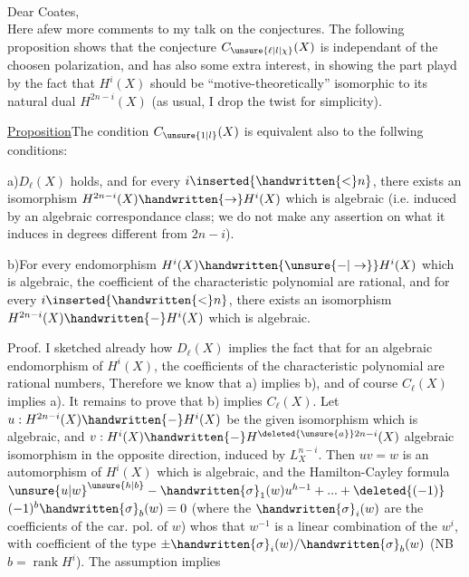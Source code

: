 \hfill{}\\
Dear Coates,\\

Here a\handwritten{$\vert$}few more comments to my talk on the conjectures. The following
proposition shows that the conjecture $C_{\unsure{\ell|l|\chi}}(X)$ is independant of the choosen
polarization, and has also some extra interest, in showing the part playd
by the fact that $H^{i}(X)$ should be ``motive-theoretically'' isomorphic to
its natural dual $H^{2n-i}(X)$ (as usual, I drop the twist for simplicity).

\uline{Proposition}\quad The condition $C_{\unsure{1|l}}(X)$ is equivalent also to  the follwing
conditions:

a)\quad $D_{\ell}(X)$ holds, and for every $i\inserted{\handwritten{<}n}$, there exists an isomorphism
$H^{2n-i}(X)\handwritten{\to}H^{i}(X)$ which is algebraic (i.e. induced by an algebraic correspondance
class; we do not make any assertion on what it induces in degrees
different from $2n-i$).

b)\quad For every endomorphism $H^{i}(X)\handwritten{\unsure{-|\to}}H^{i}(X)$ which is algebraic, the
coefficient of the characteristic polynomial are rational, and for every
$i\inserted{\handwritten{<}n}$, there exists an isomorphism $H^{2n-i}(X)\handwritten{-}H^{i}(X)$ which is algebraic.

Proof. I sketched already how $D_{\ell}(X)$ implies the fact that for an
algebraic endomorphism of $H^{i}(X)$, the coefficients of the characteristic
polynomial are rational numbers, Therefore we know that a) implies b),
and of course $C_{\ell}(X)$ implies a). It remains to prove that b) implies
$C_{\ell}(X)$. Let $u:H^{2n-i}(X)\handwritten{-}H^{i}(X)$ be the given isomorphism which is algebraic,
and $v:H^{i}(X)\handwritten{-}H^{\deleted{\unsure{a}}2n-i}(X)$  algebraic isomorphism in the opposite
direction, induced by $L_{X}^{n-i}$. Then $uv=w$ is an automorphism of $H^{i}(X)$ which
is algebraic, and the Hamilton-Cayley formula $\unsure{u|w}^{\unsure{h|b}}-\handwritten{\sigma}_{1}(w)u^{h-1}+\mathinner{...}+\deleted{(-1)}$
$(-1)^{b}\handwritten{\sigma}_{b}(w)=0$ (where the $\handwritten{\sigma}_{i}(w)$ are the coefficients of the car. pol.
of $w$) whos that $w^{-1}$ is a linear combination of the $w^{i}$, with coefficient
of the type $\pm\handwritten{\sigma}_{i}(w)/\handwritten{\sigma}_{b}(w)$ (NB $b=\operatorname{rank}H^{i}$). The assumption implies
